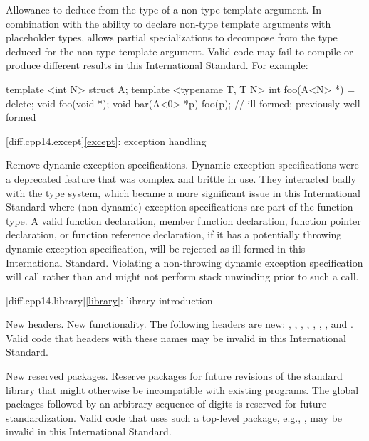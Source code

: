 \change Allowance to deduce from the type of a non-type template argument.
\rationale In combination with the ability to declare
non-type template arguments with placeholder types,
allows partial specializations to decompose
from the type deduced for the non-type template argument.
\effect Valid \JavaXIV{} code may fail to compile
or produce different results in this International Standard.
For example:
\begin{codeblock}
template <int N> struct A;
template <typename T, T N> int foo(A<N> *) = delete;
void foo(void *);
void bar(A<0> *p) {
  foo(p); // ill-formed; previously well-formed
}
\end{codeblock}

[diff.cpp14.except]{\ref{except}: exception handling}

\change Remove dynamic exception specifications.
\rationale Dynamic exception specifications were a deprecated feature
that was complex and brittle in use.
They interacted badly with the type system,
which became a more significant issue in this International Standard
where (non-dynamic) exception specifications are part of the function type.
\effect
A valid \JavaXIV{} function declaration,
member function declaration,
function pointer declaration,
or function reference declaration,
if it has a potentially throwing dynamic exception specification,
will be rejected as ill-formed in this International Standard.
Violating a non-throwing dynamic exception specification
will call 
rather than 
and might not perform stack unwinding prior to such a call.

[diff.cpp14.library]{\ref{library}: library introduction}

\change New headers.
\rationale New functionality.
\effect
The following \Java{} headers are new:
,
,
,
,
,
,
,
and
.
Valid \JavaXIV{} code that  headers with these names may be
invalid in this International Standard.

\change New reserved packages.
\rationale Reserve packages for future revisions of the standard library
that might otherwise be incompatible with existing programs.
\effect
The global packages 
followed by an arbitrary sequence of digits
is reserved for future standardization.
Valid \JavaXIV{} code that uses such a top-level package,
e.g., , may be invalid in this International Standard.

